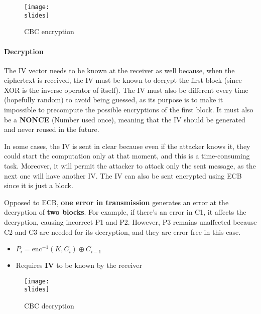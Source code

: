 \begin{figure}[H]
    \centering
    \texttt{[image: \\slides]}
    \caption{CBC encryption}
\end{figure}


\paragraph*{Decryption}
The IV vector needs to be known at the receiver as well because, when the ciphertext is received, the IV must be known to decrypt the first block (since XOR is the inverse operator of itself).
The IV must also be different every time (hopefully random) to avoid being guessed, as its purpose is to make it impossible to precompute the possible encryptions of the first block.
It must also be a \textbf{NONCE} (Number used once), meaning that the IV should be generated and never reused in the future.

In some cases, the IV is sent in clear because even if the attacker knows it, they could start the computation only at that moment, and this is a time-consuming task. Moreover, it will permit the attacker to attack only the sent message, as the next one will have another IV.
The IV can also be sent encrypted using ECB since it is just a block.

Opposed to ECB, \textbf{one error in transmission} generates an error at the
decryption of \textbf{two blocks}. For example, if there's an error in C1, it affects the decryption, causing incorrect P1 and P2. However, P3 remains unaffected because C2 and C3 are needed for its decryption, and they are error-free in this case.


\begin{itemize}
    \item $P_i = \text{enc}^{-1}(K, C_i ) \oplus C_{i-1}$
    \item Requires \textbf{IV} to be known by the receiver
\end{itemize}


\begin{figure}[H]
    \centering
    \texttt{[image: \\slides]}
    \caption{CBC decryption}
\end{figure}



